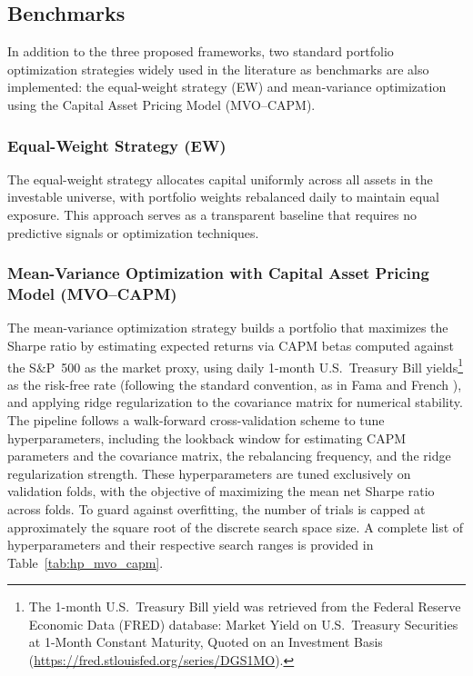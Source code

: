 \subsection{Benchmarks}

In addition to the three proposed frameworks, two standard portfolio optimization strategies widely used in the literature as benchmarks are also implemented: the equal-weight strategy (EW) and mean-variance optimization using the Capital Asset Pricing Model (MVO--CAPM).

\subsubsection{Equal-Weight Strategy (EW)}

The equal-weight strategy allocates capital uniformly across all assets in the investable universe, with portfolio weights rebalanced daily to maintain equal exposure. This approach serves as a transparent baseline that requires no predictive signals or optimization techniques.

\subsubsection{Mean-Variance Optimization with Capital Asset Pricing Model (MVO--CAPM)}

The mean-variance optimization strategy builds a portfolio that maximizes the Sharpe ratio by estimating expected returns via CAPM betas computed against the S\&P~500 as the market proxy, using daily 1-month U.S.\ Treasury Bill yields\footnote{The 1-month U.S.\ Treasury Bill yield was retrieved from the Federal Reserve Economic Data (FRED) database: Market Yield on U.S.\ Treasury Securities at 1-Month Constant Maturity, Quoted on an Investment Basis (\url{https://fred.stlouisfed.org/series/DGS1MO}).} as the risk-free rate (following the standard convention, as in Fama and French \cite{e60f7}), and applying ridge regularization to the covariance matrix for numerical stability. The pipeline follows a walk-forward cross-validation scheme to tune hyperparameters, including the lookback window for estimating CAPM parameters and the covariance matrix, the rebalancing frequency, and the ridge regularization strength. These hyperparameters are tuned exclusively on validation folds, with the objective of maximizing the mean net Sharpe ratio across folds. To guard against overfitting, the number of trials is capped at approximately the square root of the discrete search space size. A complete list of hyperparameters and their respective search ranges is provided in Table~\ref{tab:hp_mvo_capm}.

